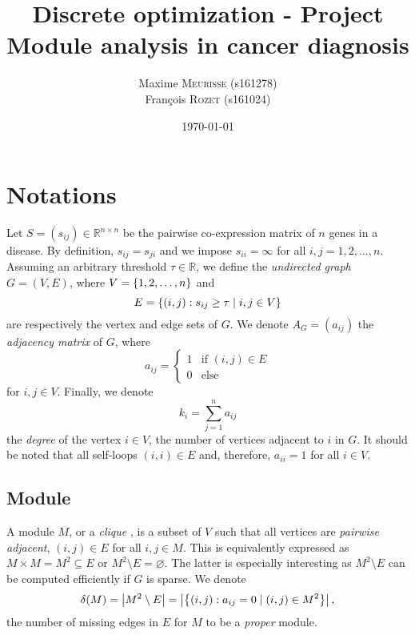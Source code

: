\documentclass[a4paper, 12pt]{article}
\title{\vspace{-2cm}Discrete optimization - Project \\[0.25em]Module analysis in cancer diagnosis}
\author{%
Maxime \textsc{Meurisse} (s161278)\\%
François \textsc{Rozet} (s161024)%
}
\date{\today}
\begin{document}
    \maketitle
    
    \section*{Notations}
    
    Let $S = (s_{ij}) \in \mathbb{R}^{n \times n}$ be the pairwise co-expression matrix of $n$ genes in a disease. By definition, $s_{ij} = s_{ji}$ and we impose $s_{ii} = \infty$ for all $i, j = 1, 2, \dots, n$. Assuming an arbitrary threshold $\tau \in \mathbb{R}$, we define the \emph{undirected graph} $G = (V, E)$, where $V = \left\{1, 2, \dots, n\right\}$ and
    \begin{equation}
       E = \left\{(i, j): s_{ij} \geq \tau \mid i, j \in V\right\}
    \end{equation}
    are respectively the vertex and edge sets of $G$. We denote $A_G = (a_{ij})$ the \emph{adjacency matrix} of $G$, where
    \begin{equation}
        a_{ij} = \begin{cases}
            1 & \text{if } (i, j) \in E \\
            0 & \text{else}
        \end{cases}
    \end{equation}
    for $i, j \in V$. Finally, we denote
    \begin{equation}
        k_i = \sum_{j = 1}^{n} a_{ij}
    \end{equation}
    the \emph{degree} of the vertex $i \in V$, \ie{} the number of vertices adjacent to $i$ in $G$. It should be noted that all self-loops $(i, i) \in E$ and, therefore, $a_{ii} = 1$ for all $i \in V$.
    
    \subsection*{Module}
    
    A module $M$, or a \emph{clique} \cite{bomze1999maximum, wiki2020clique}, is a subset of $V$ such that all vertices are \emph{pairwise adjacent}, \ie{} $(i, j) \in E$ for all $i, j \in M$. This is equivalently expressed as $M \times M = M^2 \subseteq E$ or $M^2 \setminus E = \varnothing$. The latter is especially interesting as $M^2 \setminus E$ can be computed efficiently if $G$ is sparse. We denote
    \begin{equation} \label{eq:delta}
        \delta(M) = \left|M^2 \setminus E\right| = \left|\left\{(i, j): a_{ij} = 0 \mid (i, j) \in M^2\right\}\right|,
    \end{equation}
    the number of missing edges in $E$ for $M$ to be a \emph {proper} module.
\end{document}
